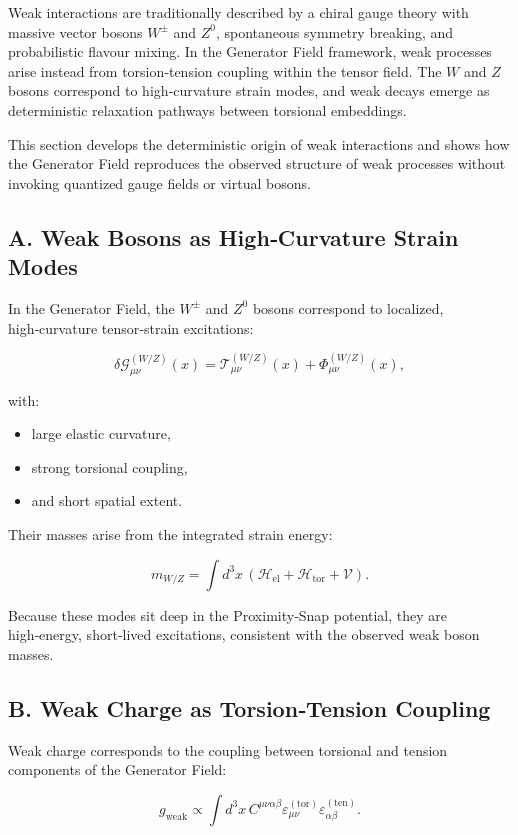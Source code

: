 \documentclass[reprint,amsmath,amssymb,aps,prl,floatfix]{revtex4-2}
\begin{document}
Weak interactions are traditionally described by a chiral gauge theory with massive vector bosons \(W^\pm\) and \(Z^0\), spontaneous symmetry breaking, and probabilistic flavour mixing. In the Generator Field framework, weak processes arise instead from torsion‑tension coupling within the tensor field. The \(W\) and \(Z\) bosons correspond to high‑curvature strain modes, and weak decays emerge as deterministic relaxation pathways between torsional embeddings.  
\medskip

This section develops the deterministic origin of weak interactions and shows how the Generator Field reproduces the observed structure of weak processes without invoking quantized gauge fields or virtual bosons.

\subsection{A. Weak Bosons as High‑Curvature Strain Modes}

In the Generator Field, the \(W^\pm\) and \(Z^0\) bosons correspond to localized, high‑curvature tensor‑strain excitations:

\[
\delta\mathcal{G}_{\mu\nu}^{(W/Z)}(x)
=
\mathcal{T}_{\mu\nu}^{(W/Z)}(x)
+
\Phi_{\mu\nu}^{(W/Z)}(x),
\]

with:
\begin{itemize}
\item large elastic curvature,  
\item strong torsional coupling,  
\item and short spatial extent.
\end{itemize}

Their masses arise from the integrated strain energy:

\[
m_{W/Z}
=
\int d^3x\,
\left(
\mathcal{H}_{\mathrm{el}}
+
\mathcal{H}_{\mathrm{tor}}
+
\mathcal{V}
\right).
\]

Because these modes sit deep in the Proximity‑Snap potential, they are high‑energy, short‑lived excitations, consistent with the observed weak boson masses.

\subsection{B. Weak Charge as Torsion‑Tension Coupling}

Weak charge corresponds to the coupling between torsional and tension components of the Generator Field:

\[
g_{\mathrm{weak}}
\propto
\int d^3x\,
C^{\mu\nu\alpha\beta}
\varepsilon_{\mu\nu}^{(\mathrm{tor})}
\varepsilon_{\alpha\beta}^{(\mathrm{ten})}.
\]
\end{document}
